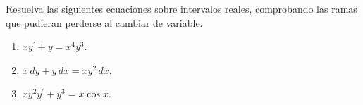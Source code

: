 Resuelva las siguientes ecuaciones sobre intervalos reales, comprobando las ramas que pudieran perderse al cambiar de variable.

\begin{enumerate}[label=(\alph*),ref=\alph*,leftmargin=*]
\item $xy^{\prime}+y=x^4y^3$.
\item $x\,dy+y\,dx=xy^2\,dx$.
\item $xy^2y^{\prime}+y^3=x\cos x$.
\end{enumerate}
